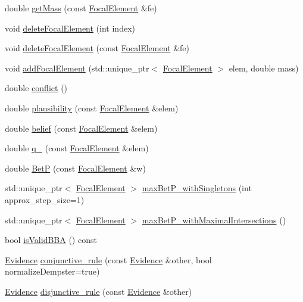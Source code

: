 \begin{DoxyCompactItemize}
\item 
double \hyperlink{classEvidence_a2f1e64bfe1c9eefc7f50a20aeab30a44}{get\+Mass} (const \hyperlink{classFocalElement}{Focal\+Element} \&fe)
\item 
void \hyperlink{classEvidence_a852aee625445547abfb4bb9a2031c10e}{delete\+Focal\+Element} (int index)
\item 
void \hyperlink{classEvidence_a1ebefa9999ec36cfd2fb782e6895e54c}{delete\+Focal\+Element} (const \hyperlink{classFocalElement}{Focal\+Element} \&fe)
\item 
void \hyperlink{classEvidence_a074be49ba8c3477d6d740a34ae2118b7}{add\+Focal\+Element} (std\+::unique\+\_\+ptr$<$ \hyperlink{classFocalElement}{Focal\+Element} $>$ elem, double mass)
\item 
double \hyperlink{classEvidence_a69d3ef43e4010c1e5ab348701b3430cb}{conflict} ()
\item 
double \hyperlink{classEvidence_a8176961ffccb6c5597b6d20140d15b4c}{plausibility} (const \hyperlink{classFocalElement}{Focal\+Element} \&elem)
\item 
double \hyperlink{classEvidence_ad4e362c68673bcdf0c63f15b3c47d652}{belief} (const \hyperlink{classFocalElement}{Focal\+Element} \&elem)
\item 
double \hyperlink{classEvidence_a1d3cb97d6c475943693880b8379d4303}{q\+\_\+} (const \hyperlink{classFocalElement}{Focal\+Element} \&elem)
\item 
double \hyperlink{classEvidence_aae3ddf2df6726ab42164adc1b608d819}{Bet\+P} (const \hyperlink{classFocalElement}{Focal\+Element} \&w)
\item 
std\+::unique\+\_\+ptr$<$ \hyperlink{classFocalElement}{Focal\+Element} $>$ \hyperlink{classEvidence_a8967d11cadf86a581716686450b9a2c8}{max\+Bet\+P\+\_\+with\+Singletons} (int approx\+\_\+step\+\_\+size=1)
\item 
std\+::unique\+\_\+ptr$<$ \hyperlink{classFocalElement}{Focal\+Element} $>$ \hyperlink{classEvidence_a1670bedca69121445d988cd2ebff1c51}{max\+Bet\+P\+\_\+with\+Maximal\+Intersections} ()
\item 
bool \hyperlink{classEvidence_aab94dd76c710a6d4be701117a4c52039}{is\+Valid\+B\+B\+A} () const 
\item 
\hyperlink{classEvidence}{Evidence} \hyperlink{classEvidence_a4fada753531a85794be21cd9937fde21}{conjunctive\+\_\+rule} (const \hyperlink{classEvidence}{Evidence} \&other, bool normalize\+Dempster=true)
\item 
\hyperlink{classEvidence}{Evidence} \hyperlink{classEvidence_ac40aa65ecd126e0ef1f8fe55eec0d4da}{disjunctive\+\_\+rule} (const \hyperlink{classEvidence}{Evidence} \&other)

\end{DoxyCompactItemize}

